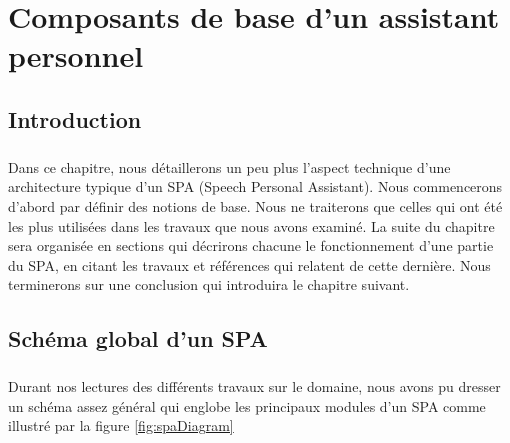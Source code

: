 \chapter{Composants de base d'un assistant personnel}

\section{Introduction}
\paragraph{}
Dans ce chapitre, nous détaillerons un peu plus l'aspect technique d'une architecture typique d'un SPA (Speech Personal Assistant). Nous commencerons d'abord par définir des notions de base. Nous ne  traiterons que celles qui ont été les plus utilisées dans les travaux que nous avons examiné. La suite du chapitre sera organisée en sections qui décrirons chacune le fonctionnement d'une partie du SPA, en citant les travaux et références qui relatent de cette dernière. Nous terminerons sur une conclusion qui introduira le chapitre suivant.

\section{Schéma global d'un SPA}
\label{spaSchemSection}
\paragraph{}
Durant nos lectures des différents travaux sur le domaine, nous avons pu dresser un schéma assez général qui englobe les principaux modules d'un SPA comme illustré par la figure \ref{fig:spaDiagram}

